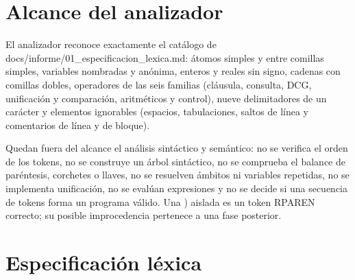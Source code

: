 \documentclass[11pt,letterpaper]{article}
\newcommand{\code}[1]{{\ttfamily\small #1}}
\begin{document}
\section{Alcance del analizador}

El analizador reconoce exactamente el catálogo de \code{docs/informe/01\_especificacion\_lexica.md}: átomos simples y entre comillas simples, variables nombradas y anónima, enteros y reales sin signo, cadenas con comillas dobles, operadores de las seis familias (cláusula, consulta, DCG, unificación y comparación, aritméticos y control), nueve delimitadores de un carácter y elementos ignorables (espacios, tabulaciones, saltos de línea y comentarios de línea y de bloque).

Quedan fuera del alcance el análisis sintáctico y semántico: no se verifica el orden de los tokens, no se construye un árbol sintáctico, no se comprueba el balance de paréntesis, corchetes o llaves, no se resuelven ámbitos ni variables repetidas, no se implementa unificación, no se evalúan expresiones y no se decide si una secuencia de tokens forma un programa válido. Una \code{)} aislada es un token \code{RPAREN} correcto; su posible improcedencia pertenece a una fase posterior.

\section{Especificación léxica}
\end{document}
